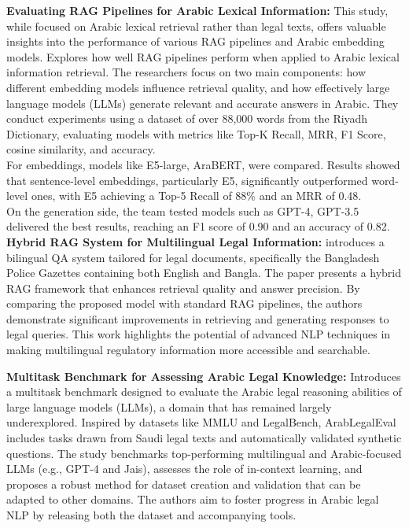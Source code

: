\textbf{Evaluating RAG Pipelines for Arabic Lexical Information:} This study, while focused on Arabic lexical retrieval rather than legal texts, offers valuable insights into the performance of various RAG pipelines and Arabic embedding models. 
\citep{arabicrag2024}Explores how well RAG pipelines perform when applied to Arabic lexical information retrieval. The researchers focus on two main components: how different embedding models influence retrieval quality, and how effectively large language models (LLMs) generate relevant and accurate answers in Arabic. They conduct experiments using a dataset of over 88,000 words from the Riyadh Dictionary, evaluating models with metrics like Top-K Recall, MRR, F1 Score, cosine similarity, and accuracy.\\
For embeddings, models like E5-large,  AraBERT, were compared. Results showed that sentence-level embeddings, particularly E5, significantly outperformed word-level ones, with E5 achieving a Top-5 Recall of 88\% and an MRR of 0.48.\\
On the generation side, the team tested models such as GPT-4, GPT-3.5 delivered the best results, reaching an F1 score of 0.90 and an accuracy of 0.82.
\textbf{Hybrid RAG System for Multilingual Legal Information:} 
\citep{legalrag2024} introduces a bilingual QA system tailored for legal documents, specifically the Bangladesh Police Gazettes containing both English and Bangla. The paper presents a hybrid RAG framework that enhances retrieval quality and answer precision. By comparing the proposed model with standard RAG pipelines, the authors  demonstrate significant improvements in retrieving and generating responses to legal queries. This work highlights the potential of advanced NLP techniques in making multilingual regulatory information more accessible and searchable.

\textbf{Multitask Benchmark for Assessing Arabic Legal Knowledge:}
\citep{arablegaleval2024} Introduces a multitask benchmark designed to evaluate the Arabic legal reasoning abilities of large language models (LLMs), a domain that has remained largely underexplored. Inspired by datasets like MMLU and LegalBench, ArabLegalEval includes tasks drawn from Saudi legal texts and automatically validated synthetic questions. The study benchmarks top-performing multilingual and Arabic-focused LLMs (e.g., GPT-4 and Jais), assesses the role of in-context learning, and proposes a robust method for dataset creation and validation that can be adapted to other domains. The authors aim to foster progress in Arabic legal NLP by releasing both the dataset and accompanying tools.


